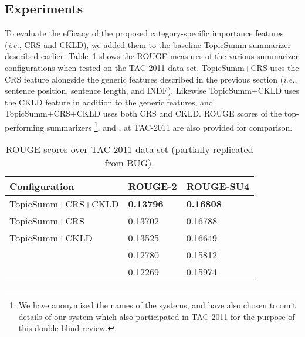 \subsection{Experiments}

To evaluate the efficacy of the proposed category-specific importance features ({\it i.e.}, CRS and CKLD), we added them to the baseline TopicSumm summarizer described earlier. Table~\ref{table:automated_eval_csi} shows the ROUGE measures of the various summarizer configurations when tested on the TAC-2011 data set. TopicSumm+CRS uses the CRS feature alongside the generic features described in the previous section ({\it i.e.}, sentence position, sentence length, and INDF). Likewise TopicSumm+CKLD uses the CKLD feature in addition to the generic features, and TopicSumm+CRS+CKLD uses both CRS and CKLD. ROUGE scores of the top-performing summarizers
\footnote{We have anonymised the names of the systems, and have also chosen to omit details of our system which also participated in TAC-2011 for the purpose of this double-blind review.}, \CLASSY and \POLYCOM, at TAC-2011 are also provided for comparison.

\begin{table}[h]
\centering
\begin{tabular}{l||l|l}
Configuration & ROUGE-2 & ROUGE-SU4 \\ \hline
TopicSumm+CRS+CKLD          & \textbf{0.13796} & \textbf{0.16808} \\
TopicSumm+CRS               & 0.13702 & 0.16788  \\
TopicSumm+CKLD              & 0.13525 & 0.16649   \\ 
\CLASSY 					& 0.12780 & 0.15812 \\
\POLYCOM 					& 0.12269 & 0.15974\\
\end{tabular}
\caption{ROUGE scores over TAC-2011 data set (partially replicated from BUG).}
\label{table:automated_eval_csi}
\end{table}

